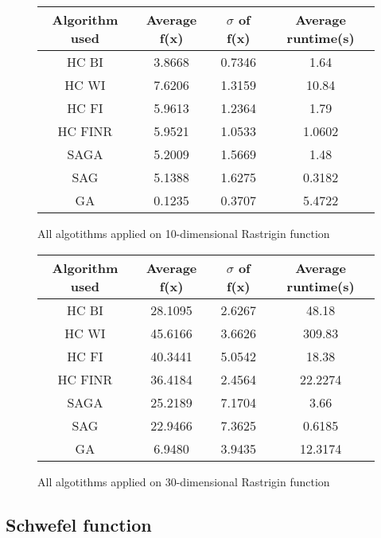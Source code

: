 \documentclass{article}
\begin{document}
\begin{figure}[H]
	\begin{tabular}{|c||c|c|c|} \hline
		Algorithm used & Average f(x) & $\sigma$ of f(x) & Average runtime(s) \\ \hline \hline
		HC BI & 3.8668 & 0.7346 & 1.64 \\ \hline
		HC WI & 7.6206 & 1.3159 & 10.84 \\ \hline
		HC FI & 5.9613 & 1.2364 & 1.79 \\ \hline
		HC FINR & 5.9521 & 1.0533 & 1.0602 \\ \hline
		SAGA & 5.2009 & 1.5669 & 1.48 \\ \hline
		SAG & 5.1388 & 1.6275 & 0.3182 \\ \hline
        GA & 0.1235 & 0.3707 & 5.4722 \\ \hline
\end{tabular}
\caption{All algotithms applied on 10-dimensional Rastrigin function}
\end{figure}

\begin{figure}[H]
	\begin{tabular}{|c||c|c|c|} \hline
		Algorithm used & Average f(x) & $\sigma$ of f(x) & Average runtime(s) \\ \hline \hline
		HC BI & 28.1095 & 2.6267 & 48.18 \\ \hline
		HC WI & 45.6166 & 3.6626 & 309.83 \\ \hline
		HC FI & 40.3441 & 5.0542 & 18.38 \\ \hline
		HC FINR & 36.4184 & 2.4564 & 22.2274 \\ \hline
		SAGA & 25.2189 & 7.1704 & 3.66 \\ \hline
		SAG & 22.9466 & 7.3625 & 0.6185 \\ \hline
        GA & 6.9480 & 3.9435 & 12.3174 \\ \hline
\end{tabular}
\caption{All algotithms applied on 30-dimensional Rastrigin function}
\end{figure}

\subsection{Schwefel function}
\end{document}
